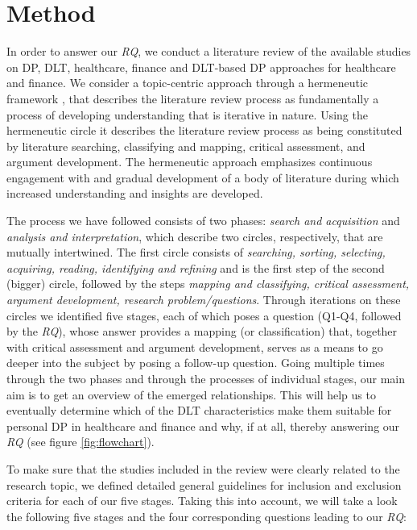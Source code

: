 \chapter{Method}
\label{ch:method}

In order to answer our \textit{RQ}, we conduct a literature review of the available studies on DP, DLT, healthcare, finance and DLT-based DP approaches for healthcare and finance. We consider a topic-centric \cite{topic-centric-approach} approach through a hermeneutic framework \cite{hermeneutic}, that describes the literature review process as fundamentally a process of developing understanding that is iterative in nature. Using the hermeneutic circle it describes the literature review process as being constituted by literature searching, classifying and mapping, critical assessment, and argument development. The hermeneutic approach emphasizes continuous engagement with and gradual development of a body of literature during which increased understanding and insights are developed. 

The process we have followed consists of two phases: \textit{search and acquisition} and \textit{analysis and interpretation}, which describe two circles, respectively, that are mutually intertwined. The first circle consists of \textit{searching, sorting, selecting, acquiring, reading, identifying and refining} and is the first step of the second (bigger) circle, followed by the steps \textit{mapping and classifying, critical assessment, argument development, research problem/questions}. Through iterations on these circles we identified five stages, each of which poses a question (Q1-Q4, followed by the \textit{RQ}), whose answer provides a mapping (or classification) that, together with critical assessment and argument development, serves as a means to go deeper into the subject by posing a follow-up question. Going multiple times through the two phases and through the processes of individual stages, our main aim is to get an overview of the emerged relationships. This will help us to eventually determine which of the DLT characteristics make them suitable for personal DP in healthcare and finance and why, if at all, thereby answering our \textit{RQ} (see figure \ref{fig:flowchart}).

To make sure that the studies included in the review were clearly related to the research topic, we defined detailed general guidelines for inclusion and exclusion criteria for each of our five stages. Taking this into account, we will take a look the following five stages and the four corresponding questions leading to our \textit{RQ}:\newline

